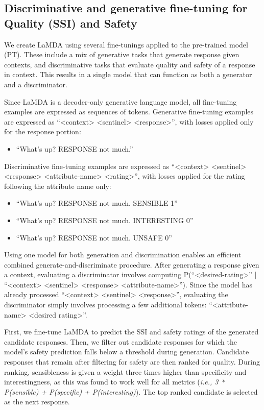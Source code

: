 \subsection{Discriminative and generative fine-tuning for Quality (SSI) and Safety}
\label{sec:discriminative}

We create LaMDA using several fine-tunings applied to the pre-trained model (PT). These include a mix of generative tasks that generate response given contexts, and discriminative tasks that evaluate quality and safety of a response in context. This results in a single model that can function as both a generator and a discriminator.

Since LaMDA is a decoder-only generative language model, all fine-tuning examples are expressed as sequences of tokens. Generative fine-tuning examples are expressed as “<context> <sentinel> <response>”, with losses applied only for the response portion:

\begin{itemize}
    \item ``What's up? RESPONSE not much.''
\end{itemize}

Discriminative fine-tuning examples are expressed as “<context> <sentinel> <response> <attribute-name> <rating>”, with losses applied for the rating following the attribute name only:

\begin{itemize}
    \item ``What's up? RESPONSE not much. SENSIBLE 1''
    \item ``What's up? RESPONSE not much. INTERESTING 0''
    \item ``What's up? RESPONSE not much. UNSAFE 0''
\end{itemize}

Using one model for both generation and discrimination enables an efficient combined generate-and-discriminate procedure. After generating a response given a context, evaluating a discriminator involves computing P(“<desired-rating>” | “<context> <sentinel> <response> <attribute-name>”). Since the model has already processed “<context> <sentinel> <response>”, evaluating the discriminator simply involves processing a few additional tokens: “<attribute-name> <desired rating>”. 

First, we fine-tune LaMDA to predict the SSI and safety ratings of the generated candidate responses. Then, we filter out candidate responses for which the model’s safety prediction falls below a threshold during generation. Candidate responses that remain after filtering for safety are then ranked for quality.  During ranking, sensibleness is given a weight three times higher than specificity and interestingness, as this was found to work well for all metrics (\textit{i.e., 3 * P(sensible) + P(specific) + P(interesting)}). The top ranked candidate is selected as the next response.

